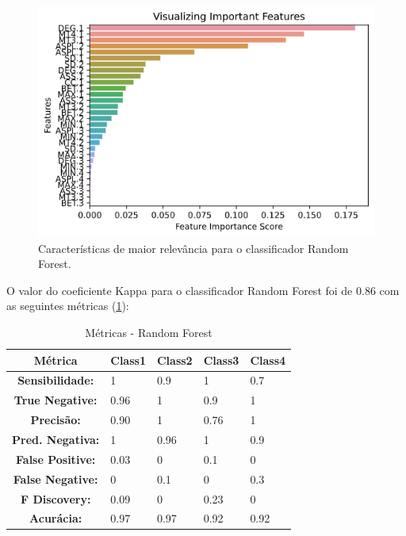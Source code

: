 \documentclass[
	article,			%
	11pt,				%
	oneside,			%
	a4paper,			%
	english,			%
	brazil,				%
	sumario=tradicional
	]{abntex2}
\begin{document}
\begin{figure}[h!]
 \centering
 \includegraphics[scale=0.7]{fig/rf_feat.png}
 \caption{Características de maior relevância para o classificador Random Forest.}
 \label{fig:rf_feat}
\end{figure}

O valor do coeficiente Kappa para o classificador Random Forest foi de $0.86$ com as seguintes métricas (\ref{tab:metrics_rf}):

\begin{table}[]
\centering
\begin{tabular}{|c|l|l|l|l|}
\hline
\textbf{Métrica}         & \textbf{Class1} & \textbf{Class2} & \textbf{Class3} & \textbf{Class4} \\ \hline
\textbf{Sensibilidade:}  & 1               & 0.9             & 1               & 0.7             \\ \hline
\textbf{True Negative:}  & 0.96            & 1               & 0.9             & 1               \\ \hline
\textbf{Precisão:}       & 0.90            & 1               & 0.76            & 1               \\ \hline
\textbf{Pred. Negativa:} & 1               & 0.96            & 1               & 0.9             \\ \hline
\textbf{False Positive:} & 0.03            & 0               & 0.1             & 0               \\ \hline
\textbf{False Negative:} & 0               & 0.1             & 0               & 0.3             \\ \hline
\textbf{F Discovery:}    & 0.09            & 0               & 0.23            & 0               \\ \hline
\textbf{Acurácia:}       & 0.97            & 0.97            & 0.92            & 0.92            \\ \hline
\end{tabular}
\caption{Métricas - Random Forest}
\label{tab:metrics_rf}
\end{table}
\end{document}
